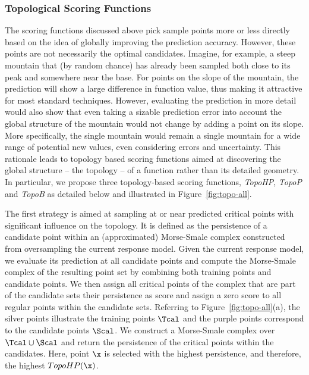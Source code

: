 \subsubsection{Topological Scoring Functions}
\label{sec:toposcoring}
The scoring functions discussed above pick sample points more or less directly based on the idea of globally improving the prediction accuracy.
%
However, these points are not necessarily the optimal candidates.
%
Imagine, for example, a steep mountain that (by random chance) has already been sampled both close to its peak and somewhere near the base.
%
For points on the slope of the mountain, the prediction will show a large difference in function value, thus making it attractive for most standard techniques.
%
However, evaluating the prediction in more detail would also show that even taking a sizable prediction error into account the global structure of the mountain would not change by adding a point on its slope.
%
More specifically, the single mountain would remain a single mountain for a wide range of potential new values, even considering errors and uncertainty.
%
This rationale leads to topology based scoring functions aimed at discovering the global structure -- the topology -- of a function rather than its detailed geometry.
%
In particular, we propose three topology-based scoring functions, \emph{TopoHP}, \emph{TopoP} and \emph{TopoB} as detailed below and illustrated in Figure~\ref{fig:topo-all}.


 The first strategy is aimed at sampling at or near predicted critical points with significant influence on the topology.
%
It is defined as the persistence of a candidate point within an (approximated) Morse-Smale complex constructed from oversampling the current response model.
%
Given the current response model, we evaluate its prediction at all candidate points and compute the Morse-Smale complex of the resulting point set by combining both training points and candidate points.
%
We then assign all critical points of the complex that are part of the candidate sets their persistence as score and assign a zero score to all regular points within the candidate sets.
%
Referring to Figure~\ref{fig:topo-all}(a), the silver points illustrate the training points $\Tcal$ and the purple points correspond to the candidate points $\Scal$.
%
We construct a Morse-Smale complex over $\Tcal \cup \Scal$ and return the persistence of the critical points within the candidates.
%
Here, point $\x$ is selected with the highest persistence, and therefore, the highest $TopoHP(\x)$.

